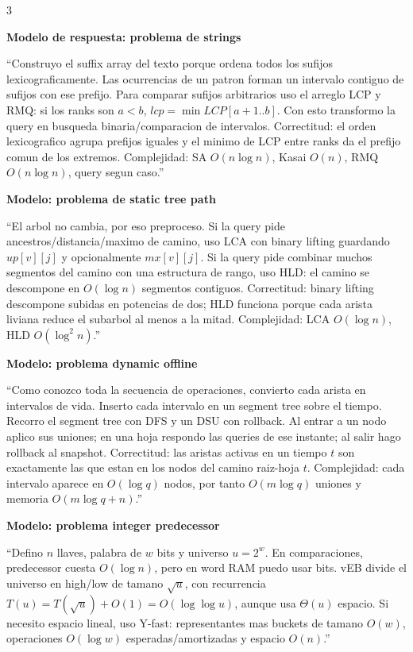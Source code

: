 \documentclass[8pt]{extarticle}
\newcommand{\blk}[2]{%
  \vspace{1.3pt}
  \noindent\colorbox{head}{\parbox{\linewidth-2\fboxsep}{\textbf{#1}}}\par
  {\footnotesize #2}\par
}
\newcommand{\bigO}{O}
\begin{document}
\begin{multicols}{3}

\blk{Modelo de respuesta: problema de strings}{
``Construyo el suffix array del texto porque ordena todos los sufijos lexicograficamente. Las ocurrencias de un patron forman un intervalo contiguo de sufijos con ese prefijo. Para comparar sufijos arbitrarios uso el arreglo LCP y RMQ: si los ranks son \(a<b\), \(lcp=\min LCP[a+1..b]\). Con esto transformo la query en busqueda binaria/comparacion de intervalos. Correctitud: el orden lexicografico agrupa prefijos iguales y el minimo de LCP entre ranks da el prefijo comun de los extremos. Complejidad: SA \(\bigO(n\log n)\), Kasai \(\bigO(n)\), RMQ \(\bigO(n\log n)\), query segun caso.''}

\blk{Modelo: problema de static tree path}{
``El arbol no cambia, por eso preproceso. Si la query pide ancestros/distancia/maximo de camino, uso LCA con binary lifting guardando \(up[v][j]\) y opcionalmente \(mx[v][j]\). Si la query pide combinar muchos segmentos del camino con una estructura de rango, uso HLD: el camino se descompone en \(\bigO(\log n)\) segmentos contiguos. Correctitud: binary lifting descompone subidas en potencias de dos; HLD funciona porque cada arista liviana reduce el subarbol al menos a la mitad. Complejidad: LCA \(\bigO(\log n)\), HLD \(\bigO(\log^2 n)\).''}

\blk{Modelo: problema dynamic offline}{
``Como conozco toda la secuencia de operaciones, convierto cada arista en intervalos de vida. Inserto cada intervalo en un segment tree sobre el tiempo. Recorro el segment tree con DFS y un DSU con rollback. Al entrar a un nodo aplico sus uniones; en una hoja respondo las queries de ese instante; al salir hago rollback al snapshot. Correctitud: las aristas activas en un tiempo \(t\) son exactamente las que estan en los nodos del camino raiz-hoja \(t\). Complejidad: cada intervalo aparece en \(\bigO(\log q)\) nodos, por tanto \(\bigO(m\log q)\) uniones y memoria \(\bigO(m\log q+n)\).''}

\blk{Modelo: problema integer predecessor}{
``Defino \(n\) llaves, palabra de \(w\) bits y universo \(u=2^w\). En comparaciones, predecessor cuesta \(\bigO(\log n)\), pero en word RAM puedo usar bits. vEB divide el universo en high/low de tamano \(\sqrt u\), con recurrencia \(T(u)=T(\sqrt u)+\bigO(1)=\bigO(\log\log u)\), aunque usa \(\Theta(u)\) espacio. Si necesito espacio lineal, uso Y-fast: representantes mas buckets de tamano \(\bigO(w)\), operaciones \(\bigO(\log w)\) esperadas/amortizadas y espacio \(\bigO(n)\).''}


\end{multicols}
\end{document}
